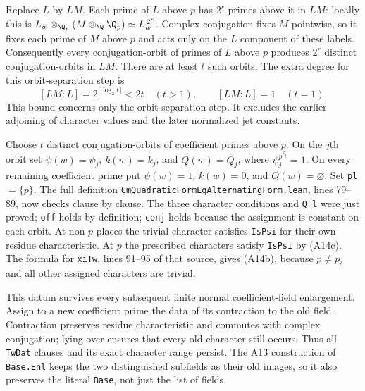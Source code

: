 Replace $L$ by $LM$.  Each prime of $L$ above $p$ has $2^r$ primes
above it in $LM$: locally this is
$L_w\otimes_{\Q_p}(M\otimes_\Q\Q_p)
 \simeq L_w^{\,2^r}$.
Complex conjugation fixes $M$ pointwise, so it fixes each prime of
$M$ above $p$ and acts only on the $L$ component of these labels.
Consequently every conjugation-orbit of primes of $L$ above $p$
produces $2^r$ distinct conjugation-orbits in $LM$.  There are at
least $t$ such orbits.  The extra degree for this orbit-separation
step is
\[
 [LM:L]=2^{\lceil\log_2 t\rceil}<2t
 \quad(t>1),
 \qquad [LM:L]=1\quad(t=1).
 \tag{A14e}
\]
This bound concerns only the orbit-separation step.  It excludes
the earlier adjoining of character values and the later normalized
jet constants.

Choose $t$ distinct conjugation-orbits of coefficient primes above
$p$.  On the $j$th orbit set
$\psi(w)=\psi_j$, $k(w)=k_j$, and $Q(w)=Q_j$, where
$\psi_j^{p^{k_j}}=1$.  On every remaining coefficient prime put
$\psi(w)=1$, $k(w)=0$, and $Q(w)=\varnothing$.
Set \texttt{pl}$=\{p\}$.  The full definition
\texttt{CmQuadraticFormEqAlternatingForm.lean}, lines 79--89,
now checks clause by clause.  The three character conditions and
\texttt{Q\_l} were just proved; \texttt{off} holds by definition;
\texttt{conj} holds because the assignment is constant on each orbit.
At non-$p$ places the trivial character satisfies \texttt{IsPsi} for
their own residue characteristic.  At $p$ the prescribed characters
satisfy \texttt{IsPsi} by (A14c).  The formula for
\texttt{xiTw}, lines 91--95 of that source, gives (A14b), because
$p\ne p_\delta$ and all other assigned characters are trivial.

This datum survives every subsequent finite normal coefficient-field
enlargement.  Assign to a new coefficient prime the data of its
contraction to the old field.  Contraction preserves residue
characteristic and commutes with complex conjugation; lying over
ensures that every old character still occurs.  Thus all
\texttt{TwDat} clauses and its exact character range persist.
The A13 construction of \texttt{Base.Enl} keeps the two distinguished
subfields as their old images, so it also preserves the literal
\texttt{Base}, not just the list of fields.

